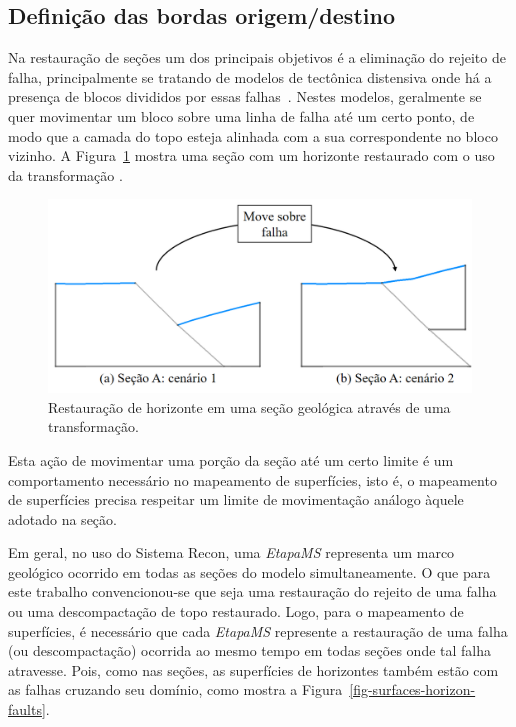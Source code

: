 \subsection{Definição das bordas origem/destino}

Na restauração de seções um dos principais objetivos é a eliminação do rejeito de falha, principalmente se tratando de modelos de tectônica distensiva onde há a presença de blocos divididos por essas falhas~\cite{Santi}. Nestes modelos, geralmente se quer movimentar um bloco sobre uma linha de falha até um certo ponto, de modo que a camada do topo esteja alinhada com a sua correspondente no bloco vizinho. A Figura~\ref{fig-section-horizon-restored} mostra uma seção com um horizonte restaurado com o uso da transformação .

\begin{figure} [H]
  \begin{center}
    \includegraphics[width=350pt]{images/fig-section-horizon-restored}
    \caption{Restauração de horizonte em uma seção geológica através de uma transformação.}\label{fig-section-horizon-restored}
  \end{center}
\end{figure}

Esta ação de movimentar uma porção da seção até um certo limite é um comportamento necessário no mapeamento de superfícies, isto é, o mapeamento de superfícies precisa respeitar um limite de movimentação análogo àquele adotado na seção.

Em geral, no uso do Sistema Recon, uma \textit{EtapaMS} representa um marco geológico ocorrido em todas as seções do modelo simultaneamente. O que para este trabalho convencionou-se que seja uma restauração do rejeito de uma falha ou uma descompactação de topo restaurado. Logo, para o mapeamento de superfícies, é necessário que cada \textit{EtapaMS} represente a restauração de uma falha (ou descompactação) ocorrida ao mesmo tempo em todas seções onde tal falha atravesse. Pois, como nas seções, as superfícies de horizontes também estão com as falhas cruzando seu domínio, como mostra a Figura~\ref{fig-surfaces-horizon-faults}.

